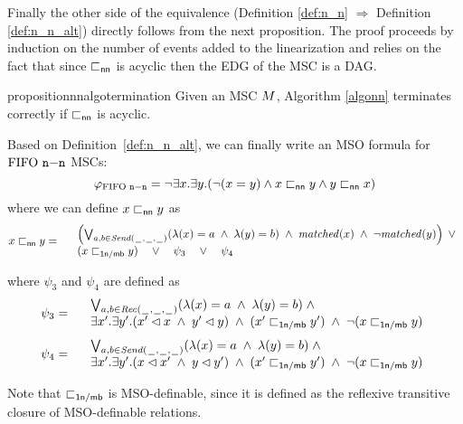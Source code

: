 Finally  the other side of the equivalence (Definition \ref{def:n_n} $\Rightarrow$ Definition \ref{def:n_n_alt}) directly follows from the next proposition. The proof  proceeds by induction on the number of events added to the linearization and relies on the fact that since $\sqsubset_{\mathsf{nn}}$ is acyclic then the EDG of the MSC is a DAG.

\begin{restatable}{proposition}{nnalgotermination}
\label{prop:nn_algo_term}
	Given an MSC $M$, Algorithm \ref{algonn}  terminates correctly if $\sqsubset_{\mathsf{nn}}$ is acyclic.
\end{restatable}

Based on Definition~\ref{def:n_n_alt}, we can finally write an MSO formula for $\text{FIFO } \mathtt{n\mathsf{-}n}$ MSCs:
\[
	\varphi_{\text{FIFO } \mathtt{n\mathsf{-}n}} = \neg \exists x.\exists y.(\neg (x = y) \wedge x \sqsubset_{\mathsf{nn}} y \wedge y \sqsubset_{\mathsf{nn}} x)
\]
where we can define $x \sqsubset_{\mathsf{nn}} y$ as
\[
	x \sqsubset_{\mathsf{nn}} y =
	\begin{array}{rl}
	& \left(
		\bigvee_{\substack{a,b \in {\mathit{Send}(\hspace{0.1em}\underline{\hspace{0.5em}}\hspace{0.1em},\hspace{0.1em}\underline{\hspace{0.5em}}\hspace{0.1em},\hspace{0.1em}\underline{\hspace{0.5em}}\hspace{0.1em})}}}
		(\lambda(x) = a \;\wedge\; \lambda(y) = b)
		\;\wedge\; \mathit{matched}(x) \;\wedge\; \neg \mathit{matched}(y)
	\right) \;\vee\\
	& (x \sqsubset_{\mathsf{1n/\mathsf{mb}}} y) \quad \vee \quad \psi_3 \quad \vee \quad \psi_4\\
	\end{array}
\]

\noindent where $\psi_3$ and $\psi_4$ are defined as
\[
	\psi_3 =
	\begin{array}{rl}
		& \bigvee_{\substack{a,b \in {\mathit{Rec}(\hspace{0.1em}\underline{\hspace{0.5em}}\hspace{0.1em},\hspace{0.1em}\underline{\hspace{0.5em}}\hspace{0.1em},\hspace{0.1em}\underline{\hspace{0.5em}}\hspace{0.1em})}}}
		  (\lambda(x) = a \;\wedge\; \lambda(y) = b)
		  \;\wedge\; \\
		& \exists x'.\exists y'.(x' \lhd x \;\wedge\; y' \lhd y) \;\wedge\; (x' \sqsubset_{\mathsf{1n/\mathsf{mb}}} y') \;\wedge\; \neg(x \sqsubset_{\mathsf{1n/\mathsf{mb}}} y)\\
	\end{array}
\]
\[
	\psi_4 =
	\begin{array}{rl}
		& \bigvee_{\substack{a,b \in {\mathit{Send}(\hspace{0.1em}\underline{\hspace{0.5em}}\hspace{0.1em},\hspace{0.1em}\underline{\hspace{0.5em}}\hspace{0.1em},\hspace{0.1em}\underline{\hspace{0.5em}}\hspace{0.1em})}}}
		  (\lambda(x) = a \;\wedge\; \lambda(y) = b)
		  \;\wedge\; \\
		& \exists x'.\exists y'.(x \lhd x' \;\wedge\; y \lhd y') \;\wedge\; (x' \sqsubset_{\mathsf{1n/\mathsf{mb}}} y') \;\wedge\; \neg(x \sqsubset_{\mathsf{1n/\mathsf{mb}}} y)\\
	\end{array}
\]

Note that $\sqsubset_{\mathsf{1n/\mathsf{mb}}}$ is MSO-definable, since it is defined as the reflexive transitive closure of MSO-definable relations.

